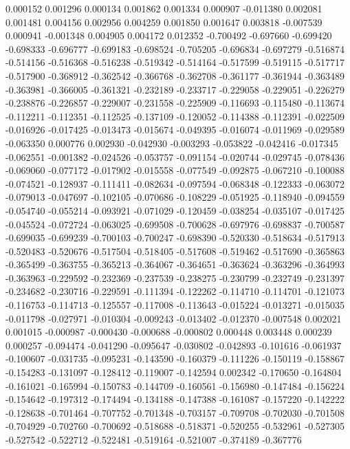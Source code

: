 0.000152
0.001296
0.000134
0.001862
0.001334
0.000907
-0.011380
0.002081
0.001481
0.004156
0.002956
0.004259
0.001850
0.001647
0.003818
-0.007539
0.000941
-0.001348
0.004905
0.004172
0.012352
-0.700492
-0.697660
-0.699420
-0.698333
-0.696777
-0.699183
-0.698524
-0.705205
-0.696834
-0.697279
-0.516874
-0.514156
-0.516368
-0.516238
-0.519342
-0.514164
-0.517599
-0.519115
-0.517717
-0.517900
-0.368912
-0.362542
-0.366768
-0.362708
-0.361177
-0.361944
-0.363489
-0.363981
-0.366005
-0.361321
-0.232189
-0.233717
-0.229058
-0.229051
-0.226279
-0.238876
-0.226857
-0.229007
-0.231558
-0.225909
-0.116693
-0.115480
-0.113674
-0.112211
-0.112351
-0.112525
-0.137109
-0.120052
-0.114388
-0.112391
-0.022509
-0.016926
-0.017425
-0.013473
-0.015674
-0.049395
-0.016074
-0.011969
-0.029589
-0.063350
0.000776
0.002930
-0.042930
-0.003293
-0.053822
-0.042416
-0.017345
-0.062551
-0.001382
-0.024526
-0.053757
-0.091154
-0.020744
-0.029745
-0.078436
-0.069060
-0.077172
-0.017902
-0.015558
-0.077549
-0.092875
-0.067210
-0.100088
-0.074521
-0.128937
-0.111411
-0.082634
-0.097594
-0.068348
-0.122333
-0.063072
-0.079013
-0.047697
-0.102105
-0.070686
-0.108229
-0.051925
-0.118940
-0.094559
-0.054740
-0.055214
-0.093921
-0.071029
-0.120459
-0.038254
-0.035107
-0.017425
-0.045524
-0.072724
-0.063025
-0.699508
-0.700628
-0.697976
-0.698837
-0.700587
-0.699035
-0.699239
-0.700103
-0.700247
-0.698390
-0.520330
-0.518634
-0.517913
-0.520483
-0.520676
-0.517504
-0.518405
-0.517608
-0.519462
-0.517690
-0.365863
-0.365499
-0.363755
-0.365213
-0.364067
-0.364651
-0.363624
-0.363296
-0.364993
-0.363963
-0.229592
-0.232369
-0.237539
-0.238275
-0.230799
-0.232749
-0.231397
-0.234682
-0.230716
-0.229591
-0.111394
-0.122262
-0.114710
-0.114701
-0.121073
-0.116753
-0.114713
-0.125557
-0.117008
-0.113643
-0.015224
-0.013271
-0.015035
-0.011798
-0.027971
-0.010304
-0.009243
-0.013402
-0.012370
-0.007548
0.002021
0.001015
-0.000987
-0.000430
-0.000688
-0.000802
0.000448
0.003448
0.000239
0.000257
-0.094474
-0.041290
-0.095647
-0.030802
-0.042893
-0.101616
-0.061937
-0.100607
-0.031735
-0.095231
-0.143590
-0.160379
-0.111226
-0.150119
-0.158867
-0.154283
-0.131097
-0.128412
-0.119007
-0.142594
0.002342
-0.170650
-0.164804
-0.161021
-0.165994
-0.150783
-0.144709
-0.160561
-0.156980
-0.147484
-0.156224
-0.154642
-0.197312
-0.174494
-0.134188
-0.147388
-0.161087
-0.157220
-0.142222
-0.128638
-0.701464
-0.707752
-0.701348
-0.703157
-0.709708
-0.702030
-0.701508
-0.704929
-0.702760
-0.700692
-0.518688
-0.518371
-0.520255
-0.532961
-0.527305
-0.527542
-0.522712
-0.522481
-0.519164
-0.521007
-0.374189
-0.367776
